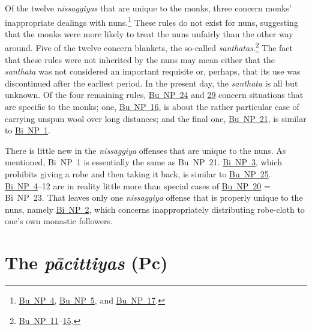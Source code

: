 \documentclass[12pt,openany]{book}%
\begin{document}
Of the twelve \textit{nissaggiyas} that are unique to the monks, three concern monks’ inappropriate dealings with nuns.\footnote{\href{https://suttacentral.net/pli-tv-bu-vb-np4/en/brahmali\#1.31.1}{Bu~NP~4}, \href{https://suttacentral.net/pli-tv-bu-vb-np5/en/brahmali\#1.2.31.1}{Bu~NP~5}, and \href{https://suttacentral.net/pli-tv-bu-vb-np17/en/brahmali\#1.20.1}{Bu~NP~17}. } These rules do not exist for nuns, suggesting that the monks were more likely to treat the nuns unfairly than the other way around. Five of the twelve concern blankets, the so-called \textit{santhatas}.\footnote{\href{https://suttacentral.net/pli-tv-bu-vb-np11/en/brahmali\#1.23.1}{Bu~NP~11}–\href{https://suttacentral.net/pli-tv-bu-vb-np15/en/brahmali\#1.3.10.1}{15}. } The fact that these rules were not inherited by the nuns may mean either that the \textit{santhata} was not considered an important requisite or, perhaps, that its use was discontinued after the earliest period. In the present day, the \textit{santhata} is all but unknown. Of the four remaining rules, \href{https://suttacentral.net/pli-tv-bu-vb-np24/en/brahmali\#1.18.1}{Bu~NP~24} and \href{https://suttacentral.net/pli-tv-bu-vb-np29/en/brahmali\#1.2.16.1}{29} concern situations that are specific to the monks; one, \href{https://suttacentral.net/pli-tv-bu-vb-np16/en/brahmali\#1.23.1}{Bu~NP~16}, is about the rather particular case of carrying unspun wool over long distances; and the final one, \href{https://suttacentral.net/pli-tv-bu-vb-np21/en/brahmali\#2.17.1}{Bu~NP~21}, is similar to \href{https://suttacentral.net/pli-tv-bi-vb-np1/en/brahmali\#1.14.1}{Bi~NP~1}.

There is little new in the \textit{nissaggiya} offenses that are unique to the nuns. As mentioned, Bi NP 1 is essentially the same as Bu NP 21. \href{https://suttacentral.net/pli-tv-bi-vb-np3/en/brahmali\#1.20.1}{Bi~NP~3}, which prohibits giving a robe and then taking it back, is similar to \href{https://suttacentral.net/pli-tv-bu-vb-np25/en/brahmali\#1.27.1}{Bu~NP~25}. \href{https://suttacentral.net/pli-tv-bi-vb-np4/en/brahmali\#1.27.1}{Bi~NP~4}–12 are in reality little more than special cases of \href{https://suttacentral.net/pli-tv-bu-vb-np20/en/brahmali\#1.35.1}{Bu~NP~20} = Bi NP 23. That leaves only one \textit{nissaggiya} offense that is properly unique to the nuns, namely \href{https://suttacentral.net/pli-tv-bi-vb-np2/en/brahmali\#1.25.1}{Bi~NP~2}, which concerns inappropriately distributing robe-cloth to one’s own monastic followers.

\section*{The \textit{\textsanskrit{pācittiyas}} (Pc)}
\end{document}
